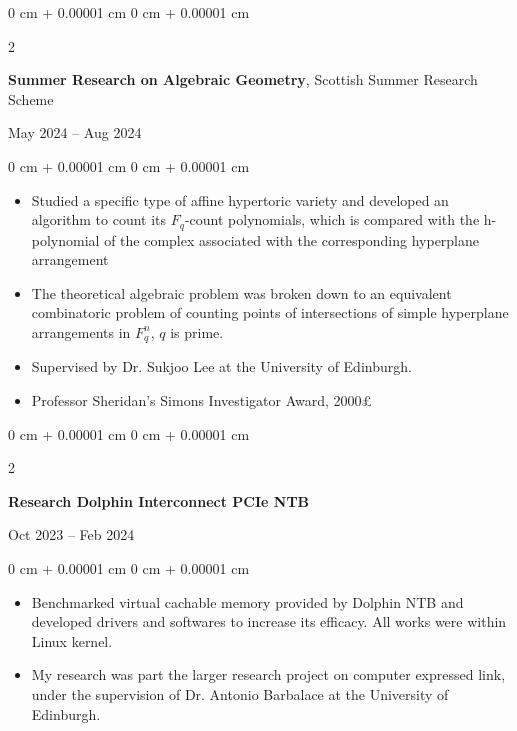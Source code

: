 \documentclass[10pt, a4paper]{article}
\newenvironment{highlights}{
    \begin{itemize}[
        topsep=0.10 cm,
        parsep=0.10 cm,
        partopsep=0pt,
        itemsep=0pt,
        leftmargin=0 cm + 10pt
    ]
}{
    \end{itemize}
} %
\newenvironment{onecolentry}{
    \begin{adjustwidth}{
        0 cm + 0.00001 cm
    }{
        0 cm + 0.00001 cm
    }
}{
    \end{adjustwidth}
} %
\newenvironment{twocolentry}[2][]{
    \onecolentry
    \def\secondColumn{#2}
    \setcolumnwidth{\fill, 4.5 cm}
    \begin{paracol}{2}
}{
    \switchcolumn \raggedleft \secondColumn
    \end{paracol}
    \endonecolentry
} %
\begin{document}
		\begin{twocolentry}{
	            May 2024 – Aug 2024
	        }
				\textbf{Summer Research on Algebraic Geometry}, Scottish Summer Research Scheme 
			\end{twocolentry}
	        \vspace{-0.30 cm}
	        \begin{onecolentry}
	            \begin{highlights}
	                \item Studied a specific type of affine hypertoric variety and developed an algorithm to count its $F_q$-count polynomials, which is compared with the h-polynomial of the complex associated with the corresponding hyperplane arrangement
					\item The theoretical algebraic problem was broken down to an equivalent combinatoric problem of counting points of intersections of simple hyperplane arrangements in $F^n_q$, $q$ is prime.
					\item Supervised by Dr. Sukjoo Lee at the University of Edinburgh.
					\item Professor Sheridan's Simons Investigator Award, 2000£
	            \end{highlights}
	        \end{onecolentry}

        \vspace{0.2 cm}

        \begin{twocolentry}{
            Oct 2023 – Feb 2024
        }
            \textbf{Research Dolphin Interconnect PCIe NTB}
		\end{twocolentry}
        \vspace{0.10 cm}
        \begin{onecolentry}
            \begin{highlights}
				\item Benchmarked virtual cachable memory provided by Dolphin NTB and developed drivers and softwares to increase its efficacy.
				All works were within Linux kernel.
                \item My research was part the larger research project on computer expressed link, under the supervision of Dr. Antonio Barbalace at the University of Edinburgh.
            \end{highlights}
        \end{onecolentry}
		
\end{document}
